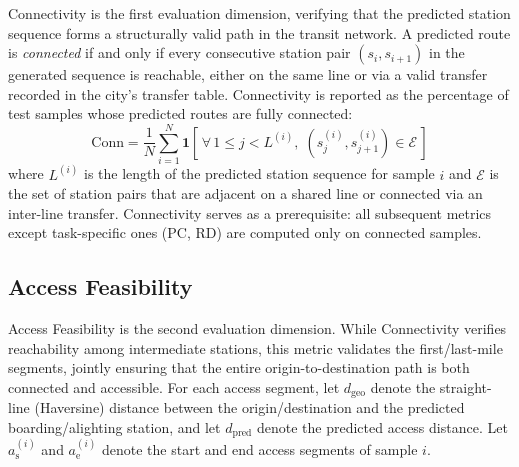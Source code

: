 \documentclass{article}
\begin{document}
Connectivity is the first evaluation dimension, verifying that the predicted station sequence forms a structurally valid path in the transit network. A predicted route is \emph{connected} if and only if every consecutive station pair $(s_i, s_{i+1})$ in the generated sequence is reachable, either on the same line or via a valid transfer recorded in the city's transfer table. Connectivity is reported as the percentage of test samples whose predicted routes are fully connected:
\begin{equation}
\text{Conn} = \frac{1}{N}\sum_{i=1}^{N} \mathbf{1}\!\left[\,\forall\, 1 \leq j < L^{(i)},\; (s_j^{(i)}, s_{j+1}^{(i)}) \in \mathcal{E}\,\right]
\end{equation}
where $L^{(i)}$ is the length of the predicted station sequence for sample $i$ and $\mathcal{E}$ is the set of station pairs that are adjacent on a shared line or connected via an inter-line transfer. Connectivity serves as a prerequisite: all subsequent metrics except task-specific ones (PC, RD) are computed only on connected samples.

\subsection{Access Feasibility}

Access Feasibility is the second evaluation dimension. While Connectivity verifies reachability among intermediate stations, this metric validates the first/last-mile segments, jointly ensuring that the entire origin-to-destination path is both connected and accessible. For each access segment, let $d_{\text{geo}}$ denote the straight-line (Haversine) distance between the origin/destination and the predicted boarding/alighting station, and let $d_{\text{pred}}$ denote the predicted access distance. Let $a_{\mathrm{s}}^{(i)}$ and $a_{\mathrm{e}}^{(i)}$ denote the start and end access segments of sample $i$.
\end{document}
